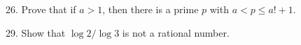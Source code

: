 \begin{mdframed}[style=darkAnswer,frametitle={Joe Starr}]
    
\end{mdframed}
\newpage
\begin{mdframed}[style=darkQuesion]
26. Prove that if $a>1$, then there is a prime $p$ with $a<p\leq a!+1$.
\end{mdframed}

\begin{mdframed}[style=darkAnswer,frametitle={Joe Starr}]
    
\end{mdframed}
\newpage
\begin{mdframed}[style=darkQuesion]
29. Show that $\log{2}/\log{3}$ is not a rational number. 
\end{mdframed}

\begin{mdframed}[style=darkAnswer,frametitle={Joe Starr}]
    
\end{mdframed}


